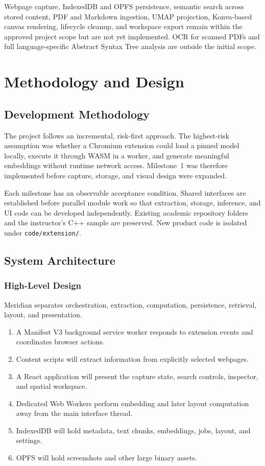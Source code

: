 \documentclass{tietreport}
\begin{document}
Webpage capture, IndexedDB and OPFS persistence, semantic search across stored content,
PDF and Markdown ingestion, UMAP projection, Konva-based canvas rendering, lifecycle cleanup,
and workspace export remain within the approved project scope but are not yet implemented.
OCR for scanned PDFs and full language-specific Abstract Syntax Tree analysis are outside the
initial scope.


\chapter{Methodology and Design}

\section{Development Methodology}

The project follows an incremental, risk-first approach. The highest-risk assumption was
whether a Chromium extension could load a pinned model locally, execute it through WASM in a
worker, and generate meaningful embeddings without runtime network access. Milestone~1 was
therefore implemented before capture, storage, and visual design were expanded.

Each milestone has an observable acceptance condition. Shared interfaces are established
before parallel module work so that extraction, storage, inference, and UI code can be
developed independently. Existing academic repository folders and the instructor's C++
sample are preserved. New product code is isolated under \texttt{code/extension/}.

\section{System Architecture}

\subsection{High-Level Design}

Meridian separates orchestration, extraction, computation, persistence, retrieval, layout,
and presentation.

\begin{enumerate}
  \item A Manifest V3 background service worker responds to extension events and coordinates
    browser actions.
  \item Content scripts will extract information from explicitly selected webpages.
  \item A React application will present the capture state, search controls, inspector, and
    spatial workspace.
  \item Dedicated Web Workers perform embedding and later layout computation away from the
    main interface thread.
  \item IndexedDB will hold metadata, text chunks, embeddings, jobs, layout, and settings.
  \item OPFS will hold screenshots and other large binary assets.
\end{enumerate}
\end{document}
